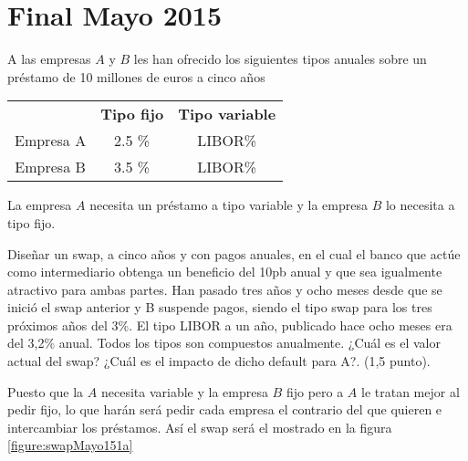 \section{Final Mayo 2015}
\begin{problem}[1]
A las empresas $A$ y $B$ les han ofrecido los siguientes tipos anuales sobre un préstamo de 10 millones de euros a cinco años

\begin{center}
\begin{tabular}{ccc}
\hline
& \textbf{Tipo fijo} & \textbf{Tipo variable} \\
Empresa A & 2.5 \% & LIBOR\% \\
Empresa B & 3.5 \% & LIBOR\% \\
\hline
\end{tabular}
\end{center}

La empresa $A$ necesita un préstamo a tipo variable y la empresa $B$ lo necesita a tipo fijo.

\ppart Diseñar un swap, a cinco años y con pagos anuales, en el cual el banco que actúe como intermediario obtenga un beneficio del 10pb anual y que sea igualmente atractivo para ambas partes.
\ppart Han pasado tres años y ocho meses desde que se inició el swap anterior y B suspende pagos, siendo el tipo swap para los tres próximos años del 3\%. El tipo LIBOR a un año, publicado hace ocho meses era
del 3,2\% anual. Todos los tipos son compuestos anualmente. ¿Cuál es el valor actual del swap? ¿Cuál es el impacto de dicho default para A?. (1,5 punto).
\solution
{}

\spart

Puesto que la $A$ necesita variable y la empresa $B$ fijo pero a $A$ le tratan mejor al pedir fijo, lo que harán será pedir cada empresa el contrario del que quieren e intercambiar los préstamos. Así el swap será el mostrado en la figura \ref{figure:swapMayo151a}

\begin{figure}[hbpt]
\centering
{}
\end{figure}
\end{problem}
